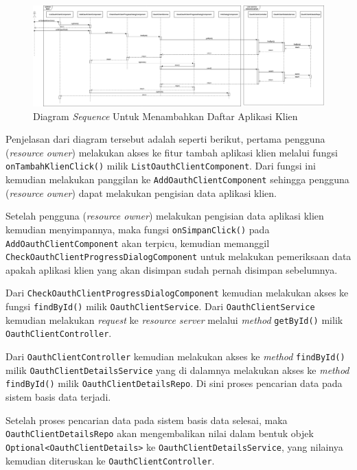 \documentclass[pdftex,12pt, oneside]{article}
\begin{document}
\begin{itemize}
	\begin{figure}[H]
		\centering
		\includegraphics[width=1\textwidth]{./resources/seq-add-client}
		\caption{Diagram \textit{Sequence} Untuk Menambahkan Daftar Aplikasi Klien}
		\label{fig:seq-add-client}
	\end{figure}
	
	Penjelasan dari diagram tersebut adalah seperti berikut, pertama pengguna (\textit{resource owner}) melakukan akses ke fitur tambah aplikasi klien melalui fungsi \texttt{onTambahKlienClick()} milik \texttt{ListOauthClientComponent}. Dari fungsi ini kemudian melakukan panggilan ke \texttt{AddOauthClientComponent} sehingga pengguna (\textit{resource owner}) dapat melakukan pengisian data aplikasi klien.
	
	Setelah pengguna (\textit{resource owner}) melakukan pengisian data aplikasi klien kemudian menyimpannya, maka fungsi \texttt{onSimpanClick()} pada \texttt{AddOauthClientComponent} akan terpicu, kemudian memanggil \texttt{CheckOauthClientProgressDialogComponent} untuk melakukan pemeriksaan data apakah aplikasi klien yang akan disimpan sudah pernah disimpan sebelumnya.
	
	Dari \texttt{CheckOauthClientProgressDialogComponent} kemudian melakukan akses ke fungsi \texttt{findById()} milik \texttt{OauthClientService}. Dari \texttt{OauthClientService} kemudian melakukan \textit{request} ke \textit{resource server} melalui \textit{method} \texttt{getById()} milik \texttt{OauthClientController}.
	
	Dari \texttt{OauthClientController} kemudian melakukan akses ke \textit{method} \texttt{findById()} milik \texttt{OauthClientDetailsService} yang di dalamnya melakukan akses ke \textit{method} \texttt{findById()} milik \texttt{OauthClientDetailsRepo}. Di sini proses pencarian data pada sistem basis data terjadi.
	
	Setelah proses pencarian data pada sistem basis data selesai, maka \texttt{OauthClientDetailsRepo} akan mengembalikan nilai dalam bentuk objek \texttt{Optional<OauthClientDetails>} ke \texttt{OauthClientDetailsService}, yang nilainya kemudian diteruskan ke \texttt{OauthClientController}.
	

\end{itemize}
\end{document}
